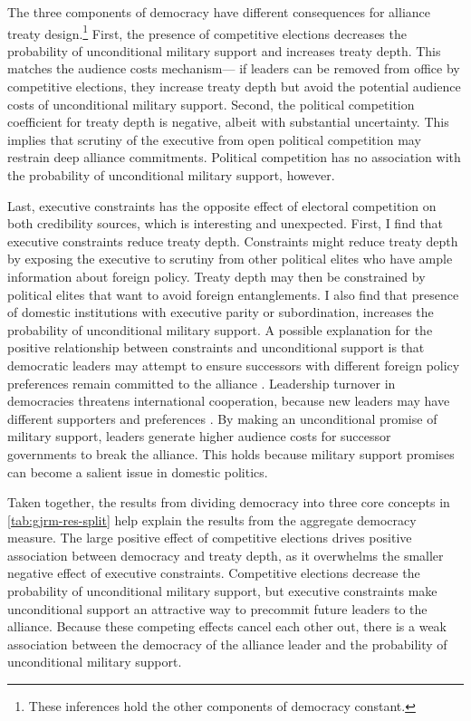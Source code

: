 \documentclass[12pt]{article}
\begin{document}
The three components of democracy have different consequences for alliance treaty design.\footnote{These inferences hold the other components of democracy constant.}
First, the presence of competitive elections decreases the probability of unconditional military support and increases treaty depth.
This matches the audience costs mechanism--- if leaders can be removed from office by competitive elections, they increase treaty depth but avoid the potential audience costs of unconditional military support. 
Second, the political competition coefficient for treaty depth is negative, albeit with substantial uncertainty. 
This implies that scrutiny of the executive from open political competition may restrain deep alliance commitments. 
Political competition has no association with the probability of unconditional military support, however. 


Last, executive constraints has the opposite effect of electoral competition on both credibility sources, which is interesting and unexpected.
First, I find that executive constraints reduce treaty depth.  
Constraints might reduce treaty depth by exposing the executive to scrutiny from other political elites who have ample information about foreign policy. 
Treaty depth may then be constrained by political elites that want to avoid foreign entanglements.  
I also find that presence of domestic institutions with executive parity or subordination, increases the probability of unconditional military support.  
A possible explanation for the positive relationship between constraints and unconditional support is that democratic leaders may attempt to ensure successors with different foreign policy preferences remain committed to the alliance \cite{Mattes2012a}. 
Leadership turnover in democracies threatens international cooperation, because new leaders may have different supporters and preferences \citep{Lobell2004, Narizny2007, Leedsetal2009}. 
By making an unconditional promise of military support, leaders generate higher audience costs for successor governments to break the alliance. 
This holds because military support promises can become a salient issue in domestic politics. 


Taken together, the results from dividing democracy into three core concepts in \autoref{tab:gjrm-res-split} help explain the results from the aggregate democracy measure. 
The large positive effect of competitive elections drives positive association between democracy and treaty depth, as it overwhelms the smaller negative effect of executive constraints. 
Competitive elections decrease the probability of unconditional military support, but executive constraints make unconditional support an attractive way to precommit future leaders to the alliance. 
Because these competing effects cancel each other out, there is a weak association between the democracy of the alliance leader and the probability of unconditional military support. 
\end{document}
